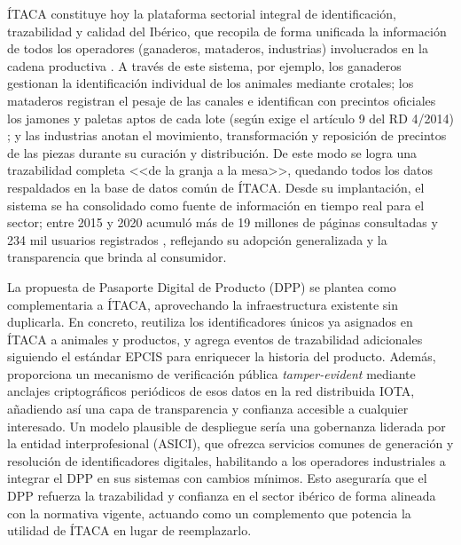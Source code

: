ÍTACA constituye hoy la plataforma sectorial integral de identificación, trazabilidad y calidad del Ibérico, que recopila de forma unificada la información de todos los operadores (ganaderos, mataderos, industrias) involucrados en la cadena productiva \cite{AppIbericoAsociacion}. A través de este sistema, por ejemplo, los ganaderos gestionan la identificación individual de los animales mediante crotales; los mataderos registran el pesaje de las canales e identifican con precintos oficiales los jamones y paletas aptos de cada lote (según exige el artículo 9 del RD 4/2014) \cite{PrecintosCategoriasAsociacion}; y las industrias anotan el movimiento, transformación y reposición de precintos de las piezas durante su curación y distribución. De este modo se logra una trazabilidad completa <<de la granja a la mesa>>, quedando todos los datos respaldados en la base de datos común de ÍTACA. Desde su implantación, el sistema se ha consolidado como fuente de información en tiempo real para el sector; entre 2015 y 2020 acumuló más de 19 millones de páginas consultadas y 234 mil usuarios registrados \cite{ConsumoRecuerdaQue2022}, reflejando su adopción generalizada y la transparencia que brinda al consumidor.

La propuesta de Pasaporte Digital de Producto (DPP) se plantea como complementaria a ÍTACA, aprovechando la infraestructura existente sin duplicarla. En concreto, reutiliza los identificadores únicos ya asignados en ÍTACA a animales y productos, y agrega eventos de trazabilidad adicionales siguiendo el estándar EPCIS para enriquecer la historia del producto. Además, proporciona un mecanismo de verificación pública \textit{tamper-evident} mediante anclajes criptográficos periódicos de esos datos en la red distribuida IOTA, añadiendo así una capa de transparencia y confianza accesible a cualquier interesado. Un modelo plausible de despliegue sería una gobernanza liderada por la entidad interprofesional (ASICI), que ofrezca servicios comunes de generación y resolución de identificadores digitales, habilitando a los operadores industriales a integrar el DPP en sus sistemas con cambios mínimos. Esto aseguraría que el DPP refuerza la trazabilidad y confianza en el sector ibérico de forma alineada con la normativa vigente, actuando como un complemento que potencia la utilidad de ÍTACA en lugar de reemplazarlo.
